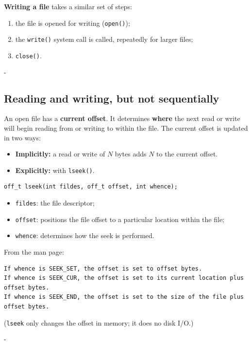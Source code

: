 \documentclass[11pt,a4paper]{article}
\makeatletter
\newcommand{\keepspace}[1]{\par\penalty-100\begingroup
  \setlength{\dimen@}{#1}\dimen@ii\pagegoal\advance\dimen@ii-\pagetotal
  \ifdim\dimen@>\dimen@ii\ifdim\dimen@ii>\z@\vfil\fi\break\fi\endgroup}
\makeatother
\begin{document}
\textbf{Writing a file} takes a similar set of steps:
\begin{enumerate}
  \item the file is opened for writing (\texttt{open()});
  \item the \texttt{write()} system call is called, repeatedly for larger
        files;
  \item \texttt{close()}.
\end{enumerate}

\keepspace{7\baselineskip}
\subsection{Reading and writing, but not sequentially}

An open file has a \textbf{current offset}. It determines \textbf{where} the
next read or write will begin reading from or writing to within the file.
The current offset is updated in two ways:
\begin{itemize}
  \item \textbf{Implicitly:} a read or write of \(N\) bytes adds \(N\) to
        the current offset.
  \item \textbf{Explicitly:} with \texttt{lseek()}.
\end{itemize}

\begin{lstlisting}[numbers=none]
off_t lseek(int fildes, off_t offset, int whence);
\end{lstlisting}
\begin{itemize}
  \item \texttt{fildes}: the file descriptor;
  \item \texttt{offset}: positions the file offset to a particular location
        within the file;
  \item \texttt{whence}: determines how the seek is performed.
\end{itemize}

From the man page:
\begin{lstlisting}[style=term]
If whence is SEEK_SET, the offset is set to offset bytes.
If whence is SEEK_CUR, the offset is set to its current location plus offset bytes.
If whence is SEEK_END, the offset is set to the size of the file plus offset bytes.
\end{lstlisting}

(\texttt{lseek} only changes the offset in memory; it does no disk I/O.)

\keepspace{7\baselineskip}
\end{document}
